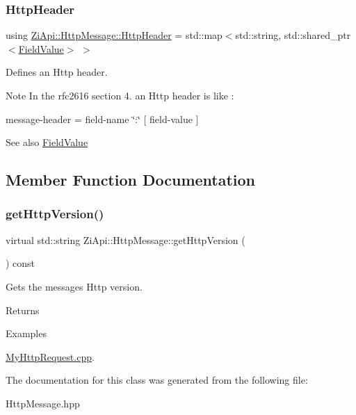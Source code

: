 \subsubsection{\texorpdfstring{HttpHeader}{HttpHeader}}
{\footnotesize\ttfamily using \mbox{\hyperlink{classZiApi_1_1HttpMessage_ae086e821289425f1c653800caf8d39d0}{Zi\+Api\+::\+Http\+Message\+::\+Http\+Header}} =  std\+::map$<$std\+::string, std\+::shared\+\_\+ptr$<$\mbox{\hyperlink{classZiApi_1_1FieldValue}{Field\+Value}}$>$ $>$}



Defines an Http header. 

\begin{DoxyNote}{Note}
In the rfc2616 section 4. an Http header is like \+: 

message-\/header = field-\/name \char`\"{}\+:\char`\"{} \mbox{[} field-\/value \mbox{]} 
\end{DoxyNote}
\begin{DoxySeeAlso}{See also}
\mbox{\hyperlink{classZiApi_1_1FieldValue}{Field\+Value}} 
\end{DoxySeeAlso}


\subsection{Member Function Documentation}
\mbox{\label{classZiApi_1_1HttpMessage_ab390b27a677152727c88efab33a50060}} 
\subsubsection{\texorpdfstring{getHttpVersion()}{getHttpVersion()}}
{\footnotesize\ttfamily virtual std\+::string Zi\+Api\+::\+Http\+Message\+::get\+Http\+Version (\begin{DoxyParamCaption}{ }\end{DoxyParamCaption}) const\hspace{0.3cm}{\ttfamily [pure virtual]}}



Gets the message\textquotesingle{}s Http version. 

\begin{DoxyReturn}{Returns}

\begin{DoxyCode}{0}
\DoxyCodeLine{\textcolor{stringliteral}{"HTTP/major.minor"} }
\end{DoxyCode}
 
\end{DoxyReturn}
\begin{Desc}
\item[Examples]\par
\mbox{\hyperlink{MyHttpRequest_8cpp-example}{My\+Http\+Request.\+cpp}}.\end{Desc}


The documentation for this class was generated from the following file\+:\begin{DoxyCompactItemize}
\item 
Http\+Message.\+hpp\end{DoxyCompactItemize}
